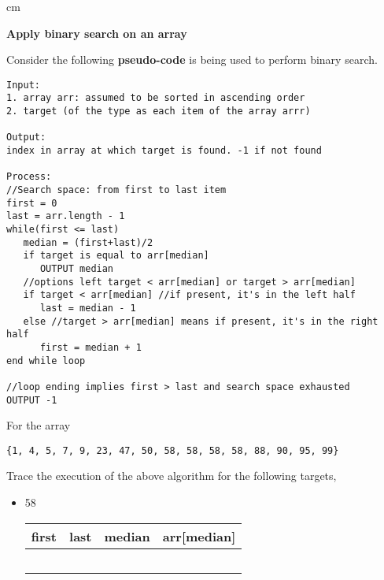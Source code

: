 \begin{center}
\end{center}


\begin{questions}

 cm 

\question  \textbf{Apply binary search on an array} 
\vskip 0.5cm

Consider the following \textbf{pseudo-code} is being used to perform binary search.

\begin{lstlisting}[numbers = none, frame = single, style = correct]
Input: 
1. array arr: assumed to be sorted in ascending order
2. target (of the type as each item of the array arrr)

Output:
index in array at which target is found. -1 if not found

Process:
//Search space: from first to last item
first = 0
last = arr.length - 1
while(first <= last)
   median = (first+last)/2
   if target is equal to arr[median]
      OUTPUT median
   //options left target < arr[median] or target > arr[median]
   if target < arr[median] //if present, it's in the left half
      last = median - 1
   else //target > arr[median] means if present, it's in the right half
      first = median + 1
end while loop

//loop ending implies first > last and search space exhausted
OUTPUT -1	
\end{lstlisting}

For the array 

\begin{verbatim}
{1, 4, 5, 7, 9, 23, 47, 50, 58, 58, 58, 58, 88, 90, 95, 99}
\end{verbatim}

Trace the execution of the above algorithm for the following targets,

\begin{itemize}
\item 58

\begin{tabular}{c | c | c | c}
\hline
first &	last &	median &	arr[median]\\
\hline
& & & \\
\hline
& & & \\
\hline
& & & \\
\hline
& & & \\
\hline
& & & \\
\end{tabular}
\vskip 0.5cm


\end{itemize}
\end{questions}
